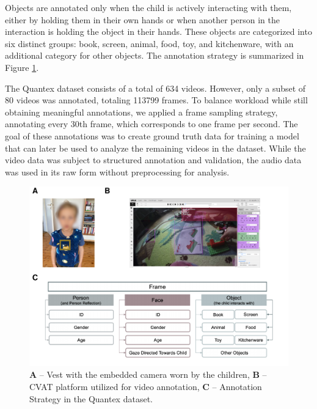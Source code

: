 \documentclass[
  man,floatsintext]{apa6}
\begin{document}
Objects are annotated only when the child is actively interacting with them, either by holding them in their own hands or when another person in the interaction is holding the object in their hands. These objects are categorized into six distinct groups: book, screen, animal, food, toy, and kitchenware, with an additional category for other objects. The annotation strategy is summarized in Figure \ref{fig:sup-camera-cvat-activity-classes}.

The Quantex dataset consists of a total of 634 videos. However, only a subset of 80 videos was annotated, totaling 113799 frames. To balance workload while still obtaining meaningful annotations, we applied a frame sampling strategy, annotating every 30th frame, which corresponds to one frame per second. The goal of these annotations was to create ground truth data for training a model that can later be used to analyze the remaining videos in the dataset. While the video data was subject to structured annotation and validation, the audio data was used in its raw form without preprocessing for analysis.

\begin{figure}

{\centering \includegraphics{Quantex_interaction_paper_files/figure-latex/sup-camera-cvat-activity-classes-1} 

}

\caption{\textbf{A} – Vest with the embedded camera worn by the children, \textbf{B} – CVAT platform utilized for video annotation, \textbf{C} – Annotation Strategy in the Quantex dataset.}\label{fig:sup-camera-cvat-activity-classes}
\end{figure}
\end{document}

